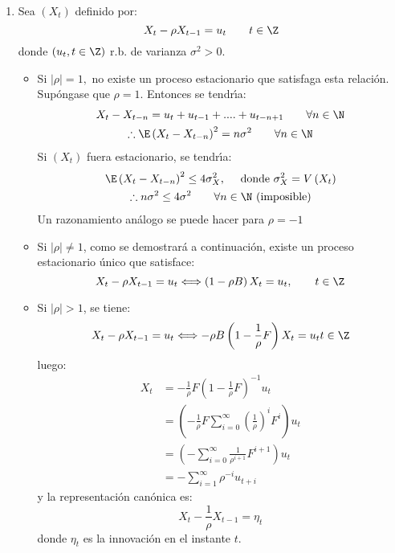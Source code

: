 \begin{ejemplo}
\begin{enumerate}
\begin{proof}[Resoluci\'{o}n]
\begin{enumerate}
Si $\varphi_{2} =$ -0,025, se obtiene la ecuaci\'{o}n asociada al polinomio autoregresivo.
\[
\varphi(z)=1-0,8z + 0,02z^{{2 }}\Leftrightarrow 
z_{{1}}=38,70 z_{{2}}=1,292
\]
Puesto que las dos ra\'{i}ces son de $\left| \right|<1$, el proceso es estacionario. As\'{i}, entonces, $\varphi_{2}= -0,025$.\qedhere
\end{enumerate} 
\end{proof}

\item Sea $\left( {X_{t} } \right)$ definido por:
\[
X_{t} -\rho X_{t-1} =u_{t} 
\qquad
t\in \Z
\]
donde $\left( {u_{t} ,t\in \Z} \right)$ r.b. de varianza $\sigma^{2}>0$.

\begin{itemize}
\item Si $\left| \rho \right|=1,$ no existe un proceso estacionario que satisfaga esta relaci\'{o}n. Sup\'{o}ngase que $\rho =1$. Entonces se tendr\'{\i}a:
\begin{gather*}
X_{t} -X_{t-n} =u_{t} +u_{t-1} +....+u_{t-n+1} \qquad\forall n\in \N\\
\therefore\E\left( {X_{t} -X_{t-n} } \right)^{2}=n\sigma^{2}\qquad\forall n\in \N
\end{gather*}
Si $\left( {X_{t} } \right)$ fuera estacionario, se tendr\'{\i}a:
\begin{gather*}
\E\left( {X_{t} -X_{t-n} } \right)^{2}\le 4\sigma_{X}^{2} ,\quad\text{ donde }\sigma_{X}^{2} =V\left( {X_{t} } \right) \\
\therefore n\sigma^{2}\le 4\sigma^{2} \qquad \forall n\in \N \text{ (imposible)}
\end{gather*}
Un razonamiento an\'{a}logo se puede hacer para $\rho =-1$

\item Si $\left| \rho \right|\ne 1$, como se demostrar\'{a} a continuaci\'{o}n, existe un proceso estacionario \'{u}nico que satisface:
\[
X_{t} -\rho X_{t-1} =u_{t} 
\Longleftrightarrow \left( {1-\rho B} \right)X_{t} =u_{t},\qquad t\in \Z
\]

\item Si $\left| \rho \right|>1$, se tiene:
\[
X_{t} -\rho X_{t-1} =u_{t} 
\Longleftrightarrow -\rho B\left( {1-\frac{1}{\rho }F} \right)X_{t} =u_{t} t\in \Z
\]
luego:
\begin{align*}
X_{t} 
	&=-\frac{1}{\rho }F\left( {1-\frac{1}{\rho }F} \right)^{-1}u_{t} \\
	&=\left( {-\frac{1}{\rho }F\sum_{i=0}^\infty {\left( {\frac{1}{\rho }} \right)^{i}F^{i}} } \right)u_{t}\\
	&=\left( {-\sum_{i=0}^\infty {\frac{1}{\rho^{i+1}}F^{i+1}} } \right)u_{t}  \\
	&=-\sum_{i=1}^\infty {\rho^{-i}u_{t+i} } 
\end{align*}
y la representaci\'{o}n can\'{o}nica es:
\[
X_{t} -\frac{1}{\rho }X_{t-1} =\eta_{t} 
\]
donde $\eta_{t} $ es la innovaci\'{o}n en el instante $t$.


\end{itemize}
\end{enumerate}
\end{ejemplo}
